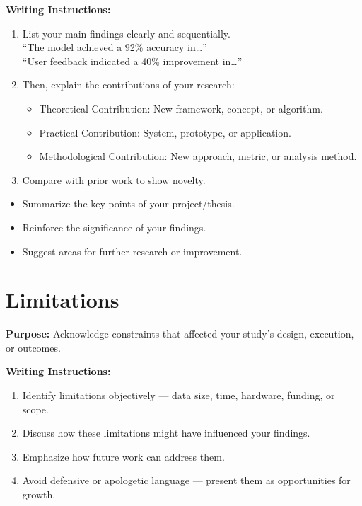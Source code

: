 {\color{red}\textbf{Writing Instructions:}
\begin{enumerate}
    \item List your main findings clearly and sequentially.\\
    ``The model achieved a 92\% accuracy in…''\\
    ``User feedback indicated a 40\% improvement in…''
    
    \item Then, explain the contributions of your research:
    \begin{itemize}
        \item Theoretical Contribution: New framework, concept, or algorithm.
        \item Practical Contribution: System, prototype, or application.
        \item Methodological Contribution: New approach, metric, or analysis method.
    \end{itemize}
    
    \item Compare with prior work to show novelty.
\end{enumerate}

\begin{itemize}
    \item Summarize the key points of your project/thesis.
    \item Reinforce the significance of your findings.
    \item Suggest areas for further research or improvement.
\end{itemize}}

\section{Limitations}

{\color{blue}\textbf{Purpose:}
Acknowledge constraints that affected your study’s design, execution, or outcomes.} \\

{\color{red}\textbf{Writing Instructions:}
\begin{enumerate}
    \item Identify limitations objectively — data size, time, hardware, funding, or scope.
    
    \item Discuss how these limitations might have influenced your findings.
    
    \item Emphasize how future work can address them.
    
    \item Avoid defensive or apologetic language — present them as opportunities for growth.
\end{enumerate}}


